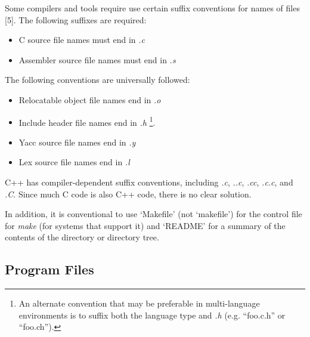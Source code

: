  Some compilers and tools require use certain suffix conventions for names of
files [5]. The following suffixes are required: 
\begin{itemize}
\item C source file names must end in {\em .c}
\item Assembler source file names must end in {\em .s}
\end{itemize}
The following conventions are universally followed:
\begin{itemize}
\item Relocatable object file names end in {\em .o}
\item Include header file names end in {\em .h}
\footnote {An alternate convention that may be preferable in multi-language
environments is to suffix both the language type and {\em .h} (e.g. ``foo.c.h''
or ``foo.ch'').}.
\item Yacc source file names end in {\em .y}
\item Lex source file names end in {\em .l}
\end{itemize}
 C++ has compiler-dependent suffix conventions, including {\em .c}, {\em ..c},
{\em .cc}, {\em .c.c}, and {\em .C}. Since much C code is also C++ code, there
is no clear solution. 

 In addition, it is conventional to use `Makefile' (not `makefile') for the
control file for {\em make} (for systems that support it) and `README' for a
summary of the contents of the directory or directory tree. 

\subsection{Program Files}

